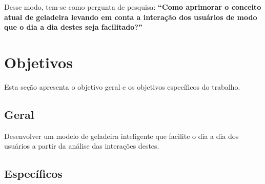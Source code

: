 Desse modo, tem-se como pergunta de pesquisa: \textbf{``Como aprimorar o conceito atual de geladeira levando em conta a interação dos usuários de modo que o dia a dia destes seja facilitado?''}


\section{Objetivos}
Esta seção apresenta o objetivo geral e os objetivos específicos do trabalho.

\subsection{Geral}



Desenvolver um modelo de geladeira inteligente que facilite o dia a dia dos usuários a partir da análise das interações destes.
    

\subsection{Específicos}


